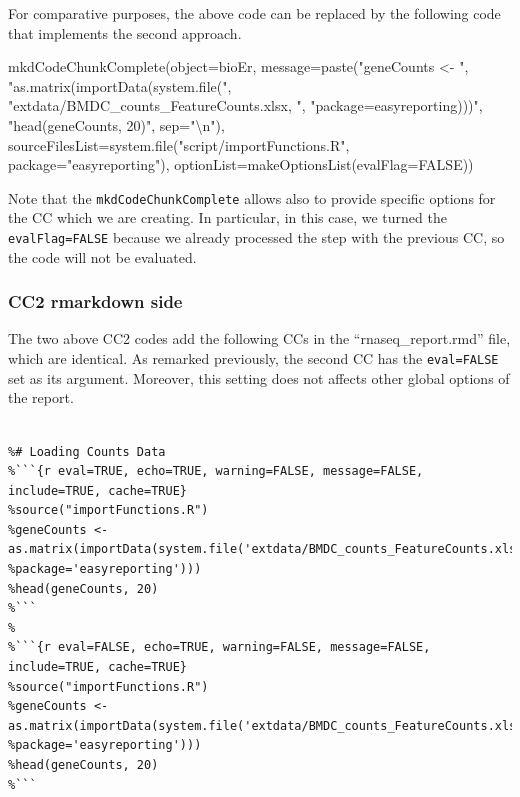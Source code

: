 \documentclass[
]{article}
\newenvironment{Shaded}{\begin{snugshade}}{\end{snugshade}}
\newcommand{\AttributeTok}[1]{\textcolor[rgb]{0.77,0.63,0.00}{#1}}
\newcommand{\ConstantTok}[1]{\textcolor[rgb]{0.00,0.00,0.00}{#1}}
\newcommand{\FunctionTok}[1]{\textcolor[rgb]{0.00,0.00,0.00}{#1}}
\newcommand{\NormalTok}[1]{#1}
\newcommand{\SpecialCharTok}[1]{\textcolor[rgb]{0.00,0.00,0.00}{#1}}
\newcommand{\StringTok}[1]{\textcolor[rgb]{0.31,0.60,0.02}{#1}}
\begin{document}
For comparative purposes, the above code can be replaced by the
following code that implements the second approach.

\begin{Shaded}
\begin{Highlighting}[]
\FunctionTok{mkdCodeChunkComplete}\NormalTok{(}\AttributeTok{object=}\NormalTok{bioEr, }\AttributeTok{message=}\FunctionTok{paste}\NormalTok{(}\StringTok{"geneCounts \textless{}{-} "}\NormalTok{,  }
                  \StringTok{"as.matrix(importData(system.file("}\NormalTok{,}
                  \StringTok{"\textquotesingle{}extdata/BMDC\_counts\_FeatureCounts.xlsx\textquotesingle{}, "}\NormalTok{, }
                  \StringTok{"package=\textquotesingle{}easyreporting\textquotesingle{})))"}\NormalTok{, }\StringTok{"head(geneCounts, 20)"}\NormalTok{, }\AttributeTok{sep=}\StringTok{"}\SpecialCharTok{\textbackslash{}n}\StringTok{"}\NormalTok{),}
                  \AttributeTok{sourceFilesList=}\FunctionTok{system.file}\NormalTok{(}\StringTok{"script/importFunctions.R"}\NormalTok{, }
                  \AttributeTok{package=}\StringTok{"easyreporting"}\NormalTok{), }
                  \AttributeTok{optionList=}\FunctionTok{makeOptionsList}\NormalTok{(}\AttributeTok{evalFlag=}\ConstantTok{FALSE}\NormalTok{))}
\end{Highlighting}
\end{Shaded}

Note that the \texttt{mkdCodeChunkComplete} allows also to provide
specific options for the CC which we are creating. In particular, in
this case, we turned the \texttt{evalFlag=FALSE} because we already
processed the step with the previous CC, so the code will not be
evaluated.

\hypertarget{cc2-rmarkdown-side}{%
\subsubsection{CC2 rmarkdown side}\label{cc2-rmarkdown-side}}

The two above CC2 codes add the following CCs in the
``rnaseq\_report.rmd'' file, which are identical. As remarked
previously, the second CC has the \texttt{eval=FALSE} set as its
argument. Moreover, this setting does not affects other global options
of the report.

\begin{verbatim}
 
%# Loading Counts Data
%```{r eval=TRUE, echo=TRUE, warning=FALSE, message=FALSE, include=TRUE, cache=TRUE}
%source("importFunctions.R")
%geneCounts <- as.matrix(importData(system.file('extdata/BMDC_counts_FeatureCounts.xlsx', 
%package='easyreporting')))
%head(geneCounts, 20)
%```
%
%```{r eval=FALSE, echo=TRUE, warning=FALSE, message=FALSE, include=TRUE, cache=TRUE}
%source("importFunctions.R")
%geneCounts <- as.matrix(importData(system.file('extdata/BMDC_counts_FeatureCounts.xlsx', 
%package='easyreporting')))
%head(geneCounts, 20)
%```
\end{verbatim}
\end{document}
